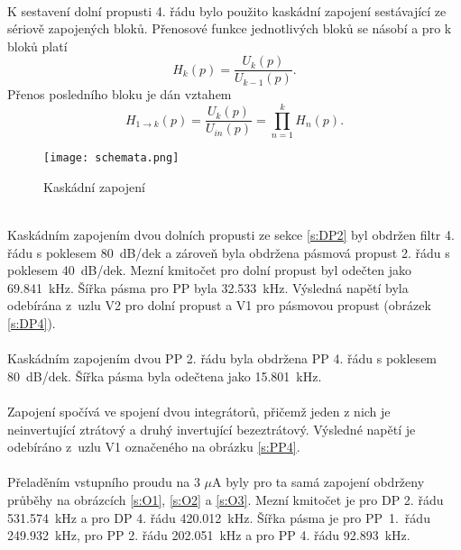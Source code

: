 \\
\noindent K sestavení dolní propusti 4. řádu bylo použito kaskádní zapojení sestávající ze sériově zapojených bloků. Přenosové funkce jednotlivých bloků se násobí a pro k bloků platí
\begin{equation}
H_k(p) = \frac{U_k (p)}{U_{k-1}(p)}.
\end{equation}
Přenos posledního bloku je dán vztahem
\begin{equation}
H_{1 \rightarrow k}(p) = \frac{U_k (p)}{U_{in}(p)} = \prod _{n=1}^{k} H_n(p).
\end{equation}
\begin{figure}[h]
\centering
\texttt{[image: schemata.png]}
\caption[Kaskádní zapojení]{Kaskádní zapojení \cite{9}}
\end{figure}
\\
\noindent Kaskádním zapojením dvou dolních propusti ze sekce \ref{s:DP2} byl obdržen filtr 4. řádu s poklesem 80~dB/dek a zároveň byla obdržena pásmová propust 2. řádu s poklesem 40~dB/dek. Mezní kmitočet pro dolní propust byl odečten jako 69.841~kHz. Šířka pásma pro PP byla 32.533~kHz. Výsledná napětí byla odebírána z~uzlu V2 pro dolní propust a V1 pro pásmovou propust (obrázek \ref{s:DP4}). \\
\\
\noindent Kaskádním zapojením dvou PP 2. řádu byla obdržena PP 4. řádu s poklesem 80~dB/dek. Šířka pásma byla odečtena jako 15.801~kHz.\\ 
\\
Zapojení spočívá ve spojení dvou integrátorů, přičemž jeden z nich je neinvertující ztrátový a druhý invertující bezeztrátový. Výsledné napětí je odebíráno z~uzlu V1 označeného na obrázku \ref{s:PP4}.\\
\\
\noindent Přeladěním vstupního proudu na 3 $\mu$A byly pro ta samá zapojení obdrženy průběhy na obrázcích \ref{s:O1}, \ref{s:O2} a  \ref{s:O3}. Mezní kmitočet je pro DP 2. řádu 531.574~kHz a pro DP 4. řádu 420.012~kHz. Šířka pásma je pro PP~1.~řádu 249.932~kHz, pro PP 2. řádu 202.051~kHz a pro PP 4. řádu 92.893~kHz.